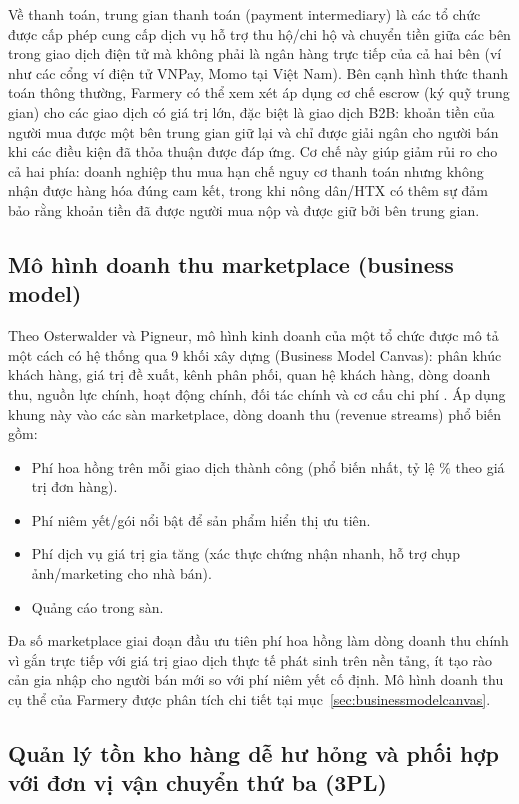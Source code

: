 Về thanh toán, trung gian thanh toán (payment intermediary) là các tổ chức được cấp phép cung cấp dịch vụ hỗ trợ thu hộ/chi hộ và chuyển tiền giữa các bên trong giao dịch điện tử mà không phải là ngân hàng trực tiếp của cả hai bên (ví như các cổng ví điện tử VNPay, Momo tại Việt Nam). Bên cạnh hình thức thanh toán thông thường, Farmery có thể xem xét áp dụng cơ chế escrow (ký quỹ trung gian) cho các giao dịch có giá trị lớn, đặc biệt là giao dịch B2B: khoản tiền của người mua được một bên trung gian giữ lại và chỉ được giải ngân cho người bán khi các điều kiện đã thỏa thuận được đáp ứng. Cơ chế này giúp giảm rủi ro cho cả hai phía: doanh nghiệp thu mua hạn chế nguy cơ thanh toán nhưng không nhận được hàng hóa đúng cam kết, trong khi nông dân/HTX có thêm sự đảm bảo rằng khoản tiền đã được người mua nộp và được giữ bởi bên trung gian.

\subsection{Mô hình doanh thu marketplace (business model)}
\label{subsec:businessmodel}

Theo Osterwalder và Pigneur, mô hình kinh doanh của một tổ chức được mô tả một cách có hệ thống qua 9 khối xây dựng (Business Model Canvas): phân khúc khách hàng, giá trị đề xuất, kênh phân phối, quan hệ khách hàng, dòng doanh thu, nguồn lực chính, hoạt động chính, đối tác chính và cơ cấu chi phí \cite{osterwalder2010bmc}. Áp dụng khung này vào các sàn marketplace, dòng doanh thu (revenue streams) phổ biến gồm:
\begin{itemize}
    \item Phí hoa hồng trên mỗi giao dịch thành công (phổ biến nhất, tỷ lệ \% theo giá trị đơn hàng).
    \item Phí niêm yết/gói nổi bật để sản phẩm hiển thị ưu tiên.
    \item Phí dịch vụ giá trị gia tăng (xác thực chứng nhận nhanh, hỗ trợ chụp ảnh/marketing cho nhà bán).
    \item Quảng cáo trong sàn.
\end{itemize}
Đa số marketplace giai đoạn đầu ưu tiên phí hoa hồng làm dòng doanh thu chính vì gắn trực tiếp với giá trị giao dịch thực tế phát sinh trên nền tảng, ít tạo rào cản gia nhập cho người bán mới so với phí niêm yết cố định. Mô hình doanh thu cụ thể của Farmery được phân tích chi tiết tại mục~\ref{sec:businessmodelcanvas}.

\subsection{Quản lý tồn kho hàng dễ hư hỏng và phối hợp với đơn vị vận chuyển thứ ba (3PL)}
\label{subsec:khobai}

